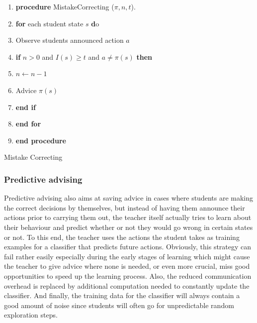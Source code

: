 \documentclass[12pt,twoside]{article}
\theoremstyle{plain}
\theoremstyle{definition}
\theoremstyle{remark}
\begin{document}
\begin{algorithm}[H]
  \scriptsize
 \begin{enumerate}
	\item \textbf{procedure} MistakeCorrecting ($\pi, n, t$). 
	\item \qquad \textbf{for} each student state $s$ \textbf do
	\item \qquad \qquad Observe students announced action $a$
	\item \qquad \qquad \textbf{if} $n > 0$ and $I(s) \geq t $  and $a \neq \pi(s)$ \textbf{then}
	\item \qquad \qquad \qquad $n \leftarrow n - 1$
	\item \qquad \qquad \qquad Advice $\pi(s)$
	\item \qquad \qquad \textbf{end if}
	\item \qquad \textbf{end for}
	\item \textbf{end procedure}
\end{enumerate}
  	\caption{Mistake Correcting}
\end{algorithm}




\subsubsection{Predictive advising}

Predictive advising also aims at saving advice in cases where students are making the correct decisions by themselves, but instead of having them announce their actions prior to carrying them out, the teacher itself actually tries to learn about their behaviour and predict whether or not they would go wrong in certain states or not. To this end, the teacher uses the actions the student takes as training examples for a classifier that predicts future actions\cite{Taylor2014reinforcement}.
Obviously, this strategy can fail rather easily especially during the early stages of learning which might cause the teacher to give advice where none is needed, or even more crucial, miss good opportunities to speed up the learning process. Also, the reduced communication overhead is replaced by additional computation needed to constantly update the classifier. And finally, the training data for the classifier will always contain a good amount of noise since students will often go for unpredictable random exploration steps.
\end{document}
